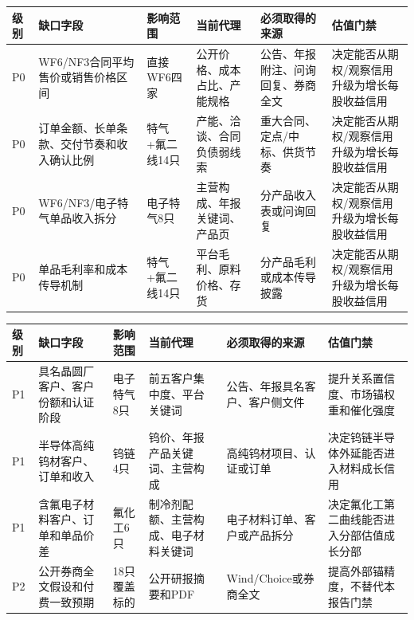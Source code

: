 \begin{exhibitbox}[硬缺口行动清单（P0）]
\scriptsize
\begin{tabularx}{\exhibitboxwidth}{L{0.7cm} L{2.2cm} L{2.1cm} X X X}
\toprule
\textbf{级别} & \textbf{缺口字段} & \textbf{影响范围} & \textbf{当前代理} & \textbf{必须取得的来源} & \textbf{估值门禁} \\
\midrule
P0 & WF6/NF3合同平均售价或销售价格区间 & 直接WF6四家 & 公开价格、成本占比、产能规格 & 公告、年报附注、问询回复、券商全文 & 决定能否从期权/观察信用升级为增长每股收益信用 \\
P0 & 订单金额、长单条款、交付节奏和收入确认比例 & 特气+氟二线14只 & 产能、洽谈、合同负债弱线索 & 重大合同、定点/中标、供货节奏 & 决定能否从期权/观察信用升级为增长每股收益信用 \\
P0 & WF6/NF3/电子特气单品收入拆分 & 电子特气8只 & 主营构成、年报关键词、产品页 & 分产品收入表或问询回复 & 决定能否从期权/观察信用升级为增长每股收益信用 \\
P0 & 单品毛利率和成本传导机制 & 特气+氟二线14只 & 平台毛利、原料价格、存货 & 分产品毛利或成本传导披露 & 决定能否从期权/观察信用升级为增长每股收益信用 \\
\bottomrule
\end{tabularx}
\end{exhibitbox}

\begin{exhibitbox}[硬缺口行动清单（P1--P2）]
\scriptsize
\begin{tabularx}{\exhibitboxwidth}{L{0.7cm} L{2.2cm} L{2.1cm} X X X}
\toprule
\textbf{级别} & \textbf{缺口字段} & \textbf{影响范围} & \textbf{当前代理} & \textbf{必须取得的来源} & \textbf{估值门禁} \\
\midrule
P1 & 具名晶圆厂客户、客户份额和认证阶段 & 电子特气8只 & 前五客户集中度、平台关键词 & 公告、年报具名客户、客户侧文件 & 提升关系置信度、市场锚权重和催化强度 \\
P1 & 半导体高纯钨材客户、订单和收入 & 钨链4只 & 钨价、年报产品关键词、主营构成 & 高纯钨材项目、认证或订单 & 决定钨链半导体外延能否进入材料成长信用 \\
P1 & 含氟电子材料客户、订单和单品价差 & 氟化工6只 & 制冷剂配额、主营构成、电子材料关键词 & 电子材料订单、客户或产品拆分 & 决定氟化工第二曲线能否进入分部估值成长分部 \\
P2 & 公开券商全文假设和付费一致预期 & 18只覆盖标的 & 公开研报摘要和PDF & Wind/Choice或券商全文 & 提高外部锚精度，不替代本报告门禁 \\
\bottomrule
\end{tabularx}
\end{exhibitbox}


